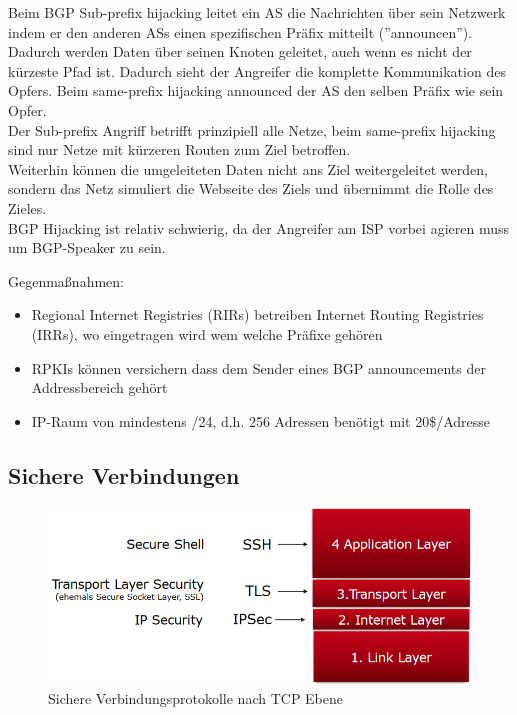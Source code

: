 \documentclass[a4paper,12pt,leqno]{article}
\begin{document}
Beim BGP Sub-prefix hijacking leitet ein AS die Nachrichten über sein Netzwerk indem er den anderen ASs einen spezifischen Präfix mitteilt (''announcen''). Dadurch werden Daten über seinen Knoten geleitet, auch wenn es nicht der kürzeste Pfad ist. Dadurch sieht der Angreifer die komplette Kommunikation des Opfers. Beim same-prefix hijacking announced der AS den selben Präfix wie sein Opfer.\\
Der Sub-prefix Angriff betrifft prinzipiell alle Netze, beim same-prefix hijacking sind nur Netze mit kürzeren Routen zum Ziel betroffen.\\
Weiterhin können die umgeleiteten Daten nicht ans Ziel weitergeleitet werden, sondern das Netz simuliert die Webseite des Ziels und übernimmt die Rolle des Zieles.\\
BGP Hijacking ist relativ schwierig, da der Angreifer am ISP vorbei agieren muss um BGP-Speaker zu sein.\\
\label{txt:BGP-PrefixHijacking}

Gegenmaßnahmen:
\begin{itemize}
\item Regional Internet Registries (RIRs) betreiben Internet Routing Registries (IRRs), wo eingetragen wird wem welche Präfixe gehören
\item RPKIs können versichern dass dem Sender eines BGP announcements der Addressbereich gehört
\item IP-Raum von mindestens /24, d.h. 256 Adressen benötigt mit 20\$/Adresse 
\end{itemize}

\subsection{Sichere Verbindungen}

\begin{figure}[h!]
\centering
\includegraphics[scale=0.42]{Grafiken/Protokolle-nach-Ebene.png}
\caption{Sichere Verbindungsprotokolle nach TCP Ebene}
\end{figure}
\end{document}
